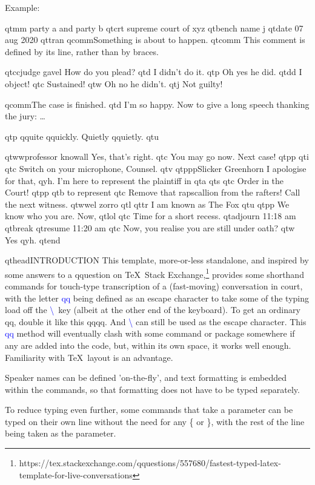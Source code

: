 \documentclass{article}
\newcommand\ccol[1]{\textcolor{blue}{#1}}
\begin{document}
\noindent Example:

qtmm party a and party b
qtcrt supreme court of xyz
qtbench name j
qtdate 07 aug 2020
qttran
qcomm{Something is about to happen.}
qtcomm This comment is defined by its line, rather than by braces.


qtcc{judge gavel} How do you plead?
qtd I didn't do it.
qtp Oh yes he did.
qtdd I object!
qtc Sustained!
qtw Oh no he didn't.
qtj  Not guilty!

qcomm{The case is finished.}
qtd I'm so happy. Now to give a long speech thanking the jury: \ldots

qtp qquite qquickly. Quietly qquietly. qtu 

qtww{professor knowall} Yes, that's right.
qtc You may go now. Next case!
qtpp qti qtc Switch on your microphone, Counsel. qtv qtppp{Slicker Greenhorn} I apologise for that,  qyh. I'm here to represent the plaintiff in qta qts qtc Order in the Court!
qtpp qtb to represent qtc Remove that rapscallion from the rafters! Call the next witness. qtww{el zorro} qtl qttr I am known as The Fox qtu qtpp We know who you are. Now, qtlol qtc Time for a short recess. qtadjourn 11:18 am qtbreak qtresume 11:20 am qtc Now, you realise you are still under oath? qtw Yes qyh. qtend

\newpage
qthead{INTRODUCTION} This template, more-or-less standalone, and inspired by some answers to a qquestion on \TeX\ Stack Exchange,\footnote{{https://tex.stackexchange.com/qquestions/557680/fastest-typed-latex-template-for-live-conversations}} provides some shorthand commands for touch-type transcription of a (fast-moving) conversation in court, with the letter \ccol{qq} being defined as an escape character to take some of the typing load off the \ccol{\textbackslash}\ key (albeit at the other end of the keyboard). To get an ordinary qq, double it like this qqqq. And \ccol{\textbackslash} can still be used as the escape character. This  \ccol{qq} method will eventually clash with some command or package somewhere if any are added into the code, but, within its own space, it works well enough. Familiarity with \TeX\  layout is an advantage.

Speaker names can be defined 'on-the-fly', and text formatting is embedded within the commands, so that formatting does not have to be typed separately.

To reduce typing even further, some commands that take a parameter can be typed on their own line without the need for any \{ or \}, with the rest of the line being taken as the parameter.
\end{document}
